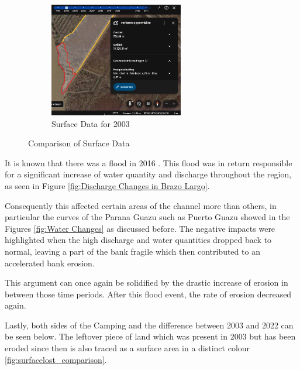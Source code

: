 \begin{figure}[H]
    \hfill
    \begin{subfigure}[b]{0.45\textwidth} %
        \includegraphics[width=\linewidth, height=5cm]{figures/appendix-g/verlorenopp2003.png}
        \caption{Surface Data for 2003}
        \label{fig:surface2003}
    \end{subfigure}
    \caption{Comparison of Surface Data}
    \label{fig:surface_comparison}
\end{figure}

It is known that there was a flood in 2016 \autocite{ArgentinaInundacionesDesde2016}. This flood was in return responsible for a significant increase of water quantity and discharge throughout the region, as seen in Figure \ref{fig:Discharge Changes in Brazo Largo}.

Consequently this affected certain areas of the channel more than others, in particular the curves of the Parana Guazu such as Puerto Guazu showed in the Figures \ref{fig:Water Changes} as discussed before. The negative impacts were highlighted when the high discharge and water quantities dropped back to normal, leaving a part of the bank fragile which then contributed to an accelerated bank erosion.



This argument can once again be solidified by the drastic increase of erosion in between those time periods. After this flood event, the rate of erosion decreased again.

Lastly, both sides of the Camping and the difference between 2003 and 2022 can be seen below. The leftover piece of land which was present in 2003 but has been eroded since then is also traced as a surface area in a distinct colour \ref{fig:surfacelost_comparison}. 

